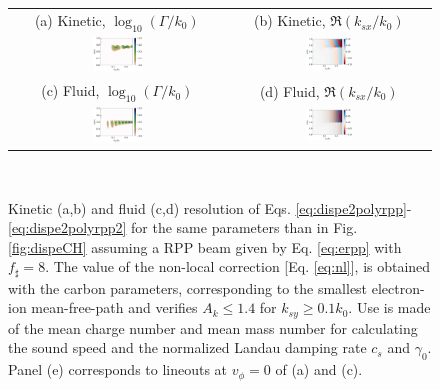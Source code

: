 \documentclass[
 reprint,
 superscriptaddress,
 amsmath,amssymb,
 aps,
]{revtex4-1}
\begin{document}
\begin{figure}
\begin{tabular}{cc}
(a) Kinetic, $\log_{10}(\Gamma/k_0)$ &
(b)  Kinetic, $\Re(k_{sx}/k_0)$ \\
\includegraphics[width=0.24\textwidth]{gkCH.eps}&
\includegraphics[width=0.24\textwidth]{kkCH.eps}\\
(c) Fluid, $\log_{10}(\Gamma/k_0)$  &
(d) Fluid, $\Re(k_{sx}/k_0)$  \\
\includegraphics[width=0.24\textwidth]{gfCH.eps}&
\includegraphics[width=0.24\textwidth]{kfCH.eps}
\end{tabular}
\\
\caption{ \label{fig:dispeCHrpp}  
Kinetic (a,b) and fluid (c,d) resolution of Eqs. \eqref{eq:dispe2polyrpp}-\eqref{eq:dispe2polyrpp2} for  the same parameters than in Fig. \ref{fig:dispeCH} assuming a RPP beam given by Eq. \eqref{eq:erpp} with $f_\sharp=8$.  The value of the non-local correction [Eq. \eqref{eq:nl}], is obtained with the carbon parameters, corresponding to the smallest electron-ion mean-free-path  and  verifies $A_k\le 1.4$ for $k_{sy}\ge 0.1k_0$. Use is made of the mean charge number and mean mass number for calculating the sound speed and the normalized Landau damping rate $c_s$ and $\gamma_0$.
Panel (e) corresponds to lineouts at $v_\phi=0$  of  (a) and (c). 
 }
\end{figure}
\end{document}
